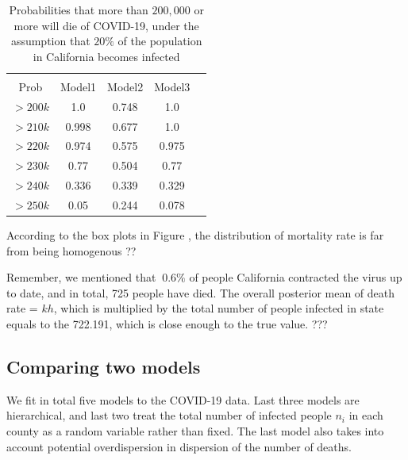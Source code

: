 \documentclass[11pt,twocolumn]{asaproc}
\begin{document}
\begin{table}
\label{table:probs}
\caption{Probabilities that more than $200,000$ or more will die of COVID-19, under the assumption that $20\%$ of the population in California becomes infected}
\begin{center}
\begin{tabular}{ccccc}
\hline
\hline
\\[-5pt]
\multicolumn{1}{c}{Prob} &
\multicolumn{1}{c}{Model1} &
\multicolumn{1}{c}{Model2} &
\multicolumn{1}{c}{Model3}\\
\hline
 $> 200k$&	1.0&	0.748 & 1.0\\
$> 210k$&	0.998&	0.677 & 1.0\\
$> 220k$&	0.974&	0.575 & 0.975\\
$> 230k$&	0.77&	0.504& 0.77\\
$> 240k$&	0.336&	0.339& 0.329\\
$> 250k$&	0.05&	0.244& 0.078\\
\hline
\end{tabular}
\end{center}
\end{table}

According to the box plots in Figure , the distribution of mortality rate is far from being homogenous ??


Remember, we mentioned that $~ 0.6\%$ of people California contracted the virus up to date, and in total, 725 people have died. The overall posterior mean of death rate = $kh$, which is multiplied by the total number of people infected in state equals to the 722.191, which is close enough to the true value. ??? 














\subsection{Comparing two models}
We fit in total five models to the COVID-19 data. Last three models are hierarchical, and last two treat the total number of infected people $n_i$ in each county as a random variable rather than fixed. The last model also takes into account potential overdispersion in dispersion of the number of deaths. 
\end{document}
